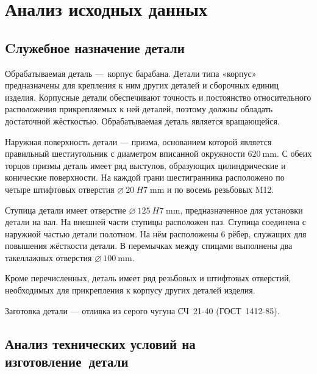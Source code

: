 \documentclass[14pt,russian,a4paper]{extreport}
\begin{document}


\setcounter{page}{3}

\tableofcontents

\chapter{Анализ исходных данных}

\section{Cлужебное назначение детали}

Обрабатываемая деталь --- корпус барабана. Детали типа «корпус» предназначены для крепления к ним других деталей и сборочных единиц изделия. Корпусные детали обеспечивают точность и постоянство относительного расположения прикрепляемых к ней деталей, поэтому должны обладать достаточной жёсткостью. Обрабатываемая деталь является вращающейся.\par

Наружная поверхность детали --- призма, основанием которой является правильный шестиугольник с диаметром вписанной окружности $\SI{620}{\milli\meter}$. С обеих торцов призмы деталь имеет ряд выступов, образующих цилиндрические и конические поверхности. На каждой грани шестигранника расположено по четыре штифтовых отверстия $\SI{20}[\diameter]{H7 \; \milli\meter}$ и по восемь резьбовых M12. \par

Ступица детали имеет отверстие $\SI{125}[\diameter]{H7 \; \milli\meter}$, предназначенное для ус\-тановки детали на вал. На внешней части ступицы расположен паз. Ступица соединена с наружной частью детали полотном. На нём расположены 6 рёбер, служащих для повышения жёсткости детали. В перемычках между спицами выполнены два такеллажных отверстия $\SI{100}[\diameter]{\milli\meter}$.  \par

Кроме перечисленных, деталь имеет ряд резьбовых и штифтовых отверстий, необходимых для прикрепления к корпусу других деталей изделия. \par

Заготовка детали --- отливка из серого чугуна СЧ~21-40 (ГОСТ~1412-85). \par



\section{Анализ технических условий на изготовление~детали}
\end{document}

